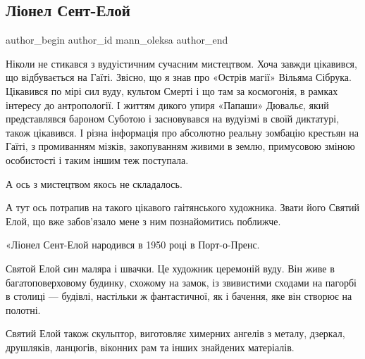 
 
 
 
 
 
\subsection{Ліонел Сент-Елой}
\label{sec:14_01_2022.fb.mann_oleksa.1.lionel_sent_enloj}
 
\ifcmt
 author_begin
   author_id mann_oleksa
 author_end
\fi

Ніколи не стикався з вудуістичним сучасним мистецтвом. Хоча завжди цікавився,
що відбувається на Гаїті. Звісно, що я знав про «Острів магії» Вільяма Сібрука.
Цікавився по мірі сил вуду, культом Смерті і що там за космогонія, в рамках
інтересу до антропології. І життям дикого упиря «Папаши» Дювальє, який
представлявся бароном Суботою і засновувався на вудуізмі в своїй диктатурі,
також цікавився. І різна інформація про абсолютно реальну зомбацію крестьян на
Гаїті, з промиванням мізків, закопуванням живими в землю, примусовою зміною
особистості і таким іншим теж поступала. 


А ось з мистецтвом якось не складалось. 

А тут ось потрапив на такого цікавого гаітянського художника. Звати його Святий
Елой, що вже забов’язало мене з ним познайомитись поближче.


«Ліонел Сент-Елой народився в 1950 році в Порт-о-Пренс. 

Святой Елой син маляра і швачки. Це художник церемоній вуду. Він живе в
багатоповерховому будинку, схожому на замок, із звивистими сходами на пагорбі в
столиці — будівлі, настільки ж фантастичної, як і бачення, яке він створює на
полотні. 

Святий Елой також скульптор, виготовляє химерних ангелів з металу, дзеркал,
друшляків, ланцюгів, віконних рам та інших знайдених матеріалів.

